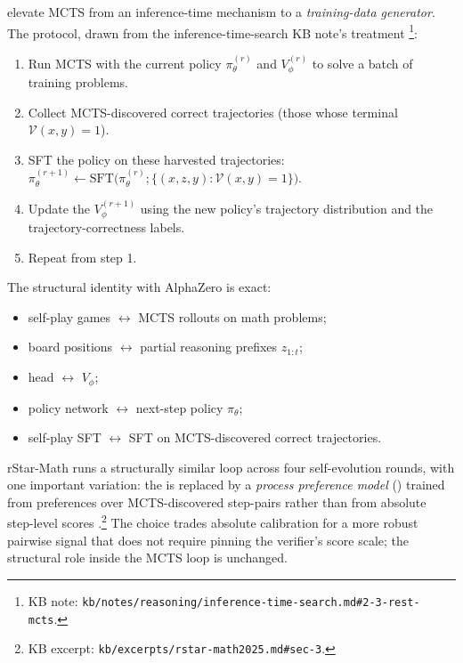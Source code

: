 \citet{zhang2024-rest-mcts} elevate MCTS from an inference-time
mechanism to a \emph{training-data generator}.
The protocol, drawn from the inference-time-search KB note's
treatment%
\footnote{KB note:
\texttt{kb/notes/reasoning/inference-time-search.md\#2-3-rest-mcts}.}:
\begin{enumerate}
\item Run MCTS with the current policy $\pi_\theta^{(r)}$ and 
$V_\phi^{(r)}$ to solve a batch of training problems.
\item Collect MCTS-discovered correct trajectories (those whose
terminal $\mathcal{V}(x, y) = 1$).
\item SFT the policy on these harvested trajectories:
$\pi_\theta^{(r+1)} \leftarrow \mathrm{SFT}\bigl(\pi_\theta^{(r)};
\{(x, z, y) : \mathcal{V}(x, y) = 1\}\bigr)$.
\item Update the  $V_\phi^{(r+1)}$ using the new policy's
trajectory distribution and the trajectory-correctness labels.
\item Repeat from step 1.
\end{enumerate}
The structural identity with AlphaZero
is exact:
\begin{itemize}
\item self-play games $\leftrightarrow$ MCTS rollouts on math problems;
\item board positions $\leftrightarrow$ partial reasoning prefixes
$z_{1:t}$;
\item {} head $\leftrightarrow$  $V_\phi$;
\item policy network $\leftrightarrow$ next-step policy $\pi_\theta$;
\item self-play SFT $\leftrightarrow$ SFT on MCTS-discovered correct
trajectories.
\end{itemize}
rStar-Math \citep{rstar-math2025} runs a structurally similar loop
across four self-evolution rounds, with one important variation: the
 is replaced by a \emph{process preference model} () trained
from preferences over MCTS-discovered step-pairs rather than from
absolute step-level scores
\citep[\S 3]{rstar-math2025}.\footnote{KB excerpt:
\texttt{kb/excerpts/rstar-math2025.md\#sec-3}.} The choice trades
absolute calibration for a more robust pairwise signal that does not
require pinning the verifier's score scale; the structural role
inside the MCTS loop is unchanged.

